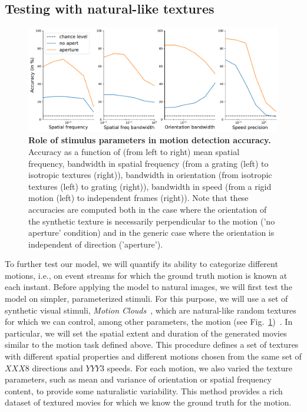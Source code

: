 \documentclass[default]{sn-jnl}%
\theoremstyle{thmstyleone}%
\theoremstyle{thmstyletwo}%
\theoremstyle{thmstylethree}%
\newcommand{\seeFig}[1]{see Fig.~\ref{fig:#1}}%
\begin{document}
\subsection{Testing with natural-like textures}
\begin{figure}%
    \centering
    \includegraphics[width=0.99\linewidth]{figures/motion_clouds.pdf} %
    \caption{{\bf Role of stimulus parameters in motion detection accuracy.} Accuracy as a function of (from left to right) mean spatial frequency, bandwidth in spatial frequency (from a grating (left) to isotropic textures (right)), bandwidth in orientation (from isotropic textures (left) to grating (right)), bandwidth in speed (from a rigid motion (left) to independent frames (right)). Note that these accuracies are computed both in the case where the orientation of the synthetic texture is necessarily perpendicular to the motion ('no aperture' condition) and in the generic case where the orientation is independent of direction ('aperture').
    }
    \label{fig:motion_clouds}
\end{figure}
To further test our model, we will quantify its ability to categorize different motions, i.e., on event streams for which the ground truth motion is known at each instant. Before applying the model to natural images, we will first test the model on simpler, parameterized stimuli. For this purpose, we will use a set of synthetic visual stimuli, \textit{Motion Clouds}~\citep{leon_motion_2012}, which are natural-like random textures for which we can control, among other parameters, the motion (\seeFig{motion_clouds})~\citep{vacher_bayesian_2018}. In particular, we will set the spatial extent and duration of the generated movies similar to the motion task defined above. This procedure defines a set of textures with different spatial properties and different motions chosen from the same set of $XXX8$ directions and $YYY3$ speeds. For each motion, we also varied the texture parameters, such as mean and variance of orientation or spatial frequency content, to provide some naturalistic variability. This method provides a rich dataset of textured movies for which we know the ground truth for the motion.
\end{document}
